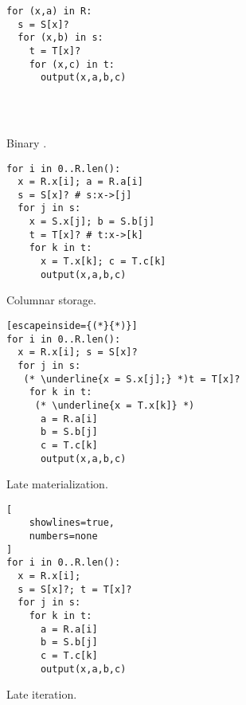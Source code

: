 \begin{figure*}
  \begin{subfigure}[t]{0.21\linewidth}
    \begin{lstlisting}[showlines=true]
for (x,a) in R:
  s = S[x]?
  for (x,b) in s:
    t = T[x]?
    for (x,c) in t:
      output(x,a,b,c)




\end{lstlisting}
    \caption{Binary \FJ.}
    \label{fig:bj-loop}
  \end{subfigure}
  \begin{subfigure}[t]{0.27\linewidth}
    \centering
    \begin{lstlisting}[showlines=true, numbers=none]
for i in 0..R.len():
  x = R.x[i]; a = R.a[i]
  s = S[x]? # s:x->[j]
  for j in s:
    x = S.x[j]; b = S.b[j]
    t = T[x]? # t:x->[k]
    for k in t:
      x = T.x[k]; c = T.c[k]
      output(x,a,b,c)

\end{lstlisting}
    \caption{Columnar storage.}
    \label{fig:column-loop}
  \end{subfigure}
  \begin{subfigure}[t]{0.25\linewidth}
    \centering
    \begin{lstlisting}[escapeinside={(*}{*)}]
for i in 0..R.len():
  x = R.x[i]; s = S[x]?
  for j in s:
   (* \underline{x = S.x[j];} *)t = T[x]?
    for k in t:
     (* \underline{x = T.x[k]} *)
      a = R.a[i]
      b = S.b[j]
      c = T.c[k]
      output(x,a,b,c)
\end{lstlisting}
    \caption{Late materialization.}
    \label{fig:late-materialization}
  \end{subfigure}
  \begin{subfigure}[t]{0.25\linewidth}
    \centering
    \begin{lstlisting}[
    showlines=true,
    numbers=none
]
for i in 0..R.len():
  x = R.x[i]; 
  s = S[x]?; t = T[x]?
  for j in s:
    for k in t:
      a = R.a[i]
      b = S.b[j]
      c = T.c[k]
      output(x,a,b,c)

\end{lstlisting}
    \caption{Late iteration.}
    \label{fig:factorized-loop}
  \end{subfigure}
  \caption{Execution of binary join for the clover query~\ref{fig:bj-loop},
    and three transformations.
    The first transformation~\ref{fig:column-loop} makes the algorithm work
    on column-wise storage instead of a row-wise one;
    the second transformation~\ref{fig:late-materialization} performs
    the classic late materialization optimization;
    the last one is another transformation that we call
    late iteration~\ref{fig:factorized-loop}.
  }
\end{figure*}

